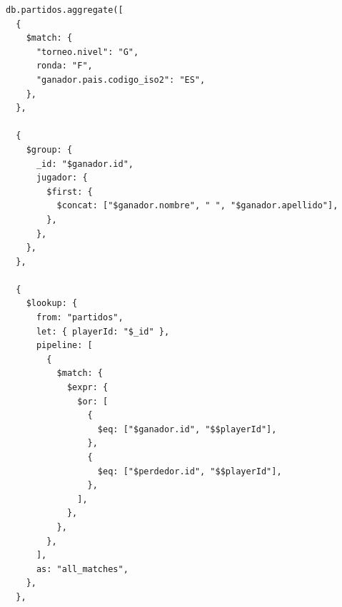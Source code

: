 \begin{verbatim}
db.partidos.aggregate([
  {
    $match: {
      "torneo.nivel": "G",
      ronda: "F",
      "ganador.pais.codigo_iso2": "ES",
    },
  },

  {
    $group: {
      _id: "$ganador.id",
      jugador: {
        $first: {
          $concat: ["$ganador.nombre", " ", "$ganador.apellido"],
        },
      },
    },
  },

  {
    $lookup: {
      from: "partidos",
      let: { playerId: "$_id" },
      pipeline: [
        {
          $match: {
            $expr: {
              $or: [
                {
                  $eq: ["$ganador.id", "$$playerId"],
                },
                {
                  $eq: ["$perdedor.id", "$$playerId"],
                },
              ],
            },
          },
        },
      ],
      as: "all_matches",
    },
  },


\end{verbatim}
